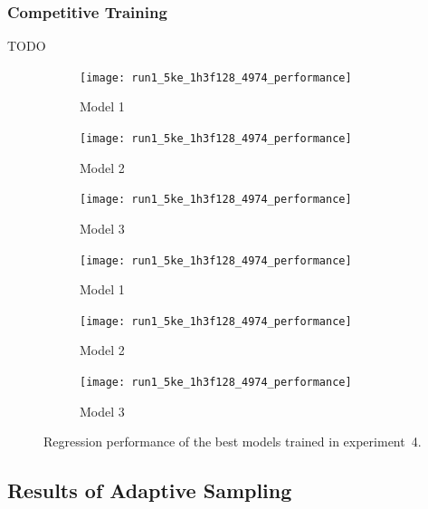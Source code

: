 \subsubsection{Competitive Training}

TODO

\begin{figure}[h]
	\centering
	\begin{subfigure}[b]{0.333\textwidth}
		\centering
		\texttt{[image: run1\_5ke\_1h3f128\_4974\_performance]}
		\caption{Model 1}
	\end{subfigure}\hfill%
	\begin{subfigure}[b]{0.333\textwidth}
		\centering
		\texttt{[image: run1\_5ke\_1h3f128\_4974\_performance]}
		\caption{Model 2}
	\end{subfigure}\hfill%
	\begin{subfigure}[b]{0.333\textwidth}
		\centering
		\texttt{[image: run1\_5ke\_1h3f128\_4974\_performance]}
		\caption{Model 3}
	\end{subfigure}

	\vspace{0.75ex}

	\begin{subfigure}[b]{0.333\textwidth}
		\centering
		\texttt{[image: run1\_5ke\_1h3f128\_4974\_performance]}
		\caption{Model 1}
	\end{subfigure}\hfill%
	\begin{subfigure}[b]{0.333\textwidth}
		\centering
		\texttt{[image: run1\_5ke\_1h3f128\_4974\_performance]}
		\caption{Model 2}
	\end{subfigure}\hfill%
	\begin{subfigure}[b]{0.333\textwidth}
		\centering
		\texttt{[image: run1\_5ke\_1h3f128\_4974\_performance]}
		\caption{Model 3}
	\end{subfigure}
	\caption{Regression performance of the best models trained in experiment~4.}
	\label{fig:reg-performance}
\end{figure}

\subsection{Results of Adaptive Sampling}
\label{sec:adaptiveres}


